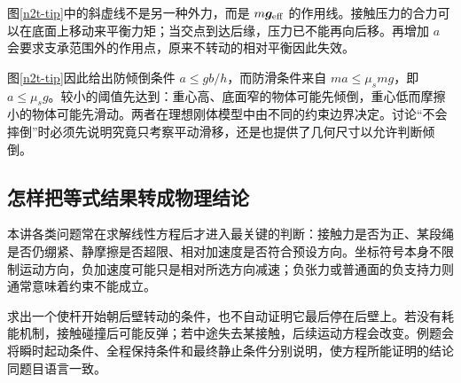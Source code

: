 图\ref{n2t-tip}中的斜虚线不是另一种外力，而是 $m\bm g_{\rm eff}$ 的作用线。接触压力的合力可以在底面上移动来平衡力矩；当交点到达后缘，压力已不能再向后移。再增加 $a$ 会要求支承范围外的作用点，原来不转动的相对平衡因此失效。

图\ref{n2t-tip}因此给出防倾倒条件 $a\le gb/h$，而防滑条件来自 $ma\le\mu_smg$，即 $a\le\mu_sg$。较小的阈值先达到：重心高、底面窄的物体可能先倾倒，重心低而摩擦小的物体可能先滑动。两者在理想刚体模型中由不同的约束边界决定。讨论“不会摔倒”时必须先说明究竟只考察平动滑移，还是也提供了几何尺寸以允许判断倾倒。

\subsection{怎样把等式结果转成物理结论}
本讲各类问题常在求解线性方程后才进入最关键的判断：接触力是否为正、某段绳是否仍绷紧、静摩擦是否超限、相对加速度是否符合预设方向。坐标符号本身不限制运动方向，负加速度可能只是相对所选方向减速；负张力或普通面的负支持力则通常意味着约束不能成立。

求出一个使杆开始朝后壁转动的条件，也不自动证明它最后停在后壁上。若没有耗能机制，接触碰撞后可能反弹；若中途失去某接触，后续运动方程会改变。例题会将瞬时起动条件、全程保持条件和最终静止条件分别说明，使方程所能证明的结论同题目语言一致。
